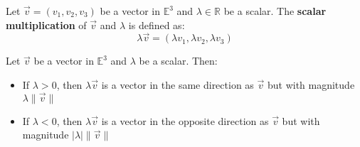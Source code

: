 \begin{definition}
  Let $\vec{v} = (v_1, v_2, v_3)$ be a vector in $\mathbb{E}^3$ and $\lambda \in \mathbb{R}$ be a scalar. The \textbf{scalar multiplication} of $\vec{v}$ and $\lambda$ is defined as:
  \begin{equation}
    \lambda \vec{v} = (\lambda v_1, \lambda v_2, \lambda v_3)
  \end{equation}
\end{definition}

\begin{tcolorbox}[title=Multiplying by a Scalar]
  Let $\vec{v}$ be a vector in $\mathbb{E}^3$ and $\lambda$ be a scalar. Then:
\begin{itemize}
  \item If $\lambda > 0$, then $\lambda \vec{v}$ is a vector in the same direction as $\vec{v}$ but with magnitude $\lambda \|\vec{v}\|$
  \item If $\lambda < 0$, then $\lambda \vec{v}$ is a vector in the opposite direction as $\vec{v}$ but with magnitude $|\lambda| \|\vec{v}\|$
\end{itemize}
\end{tcolorbox}

